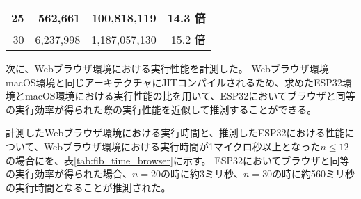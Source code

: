 \begin{table}[htbp]
\begin{center}
\begin{tabular}{rrrr}
      25 &   562,661 &   100,818,119 & 14.3 倍 \\ \hline
      30 & 6,237,998 & 1,187,057,130 & 15.2 倍 \\ \hline
    \end{tabular}
  \end{center}
\end{table}

\newpage

次に、Webブラウザ環境における実行性能を計測した。
Webブラウザ環境macOS環境と同じアーキテクチャにJITコンパイルされるため、求めたESP32環境とmacOS環境における実行性能の比を用いて、ESP32においてブラウザと同等の実行効率が得られた際の実行性能を近似して推測することができる。

計測したWebブラウザ環境における実行時間と、推測したESP32における性能について、Webブラウザ環境における実行時間が1マイクロ秒以上となった$n\leq12$の場合にを、表\ref{tab:fib_time_browser}に示す。
ESP32においてブラウザと同等の実行効率が得られた場合、$n=20$の時に約3ミリ秒、$n=30$の時に約560ミリ秒の実行時間となることが推測された。

